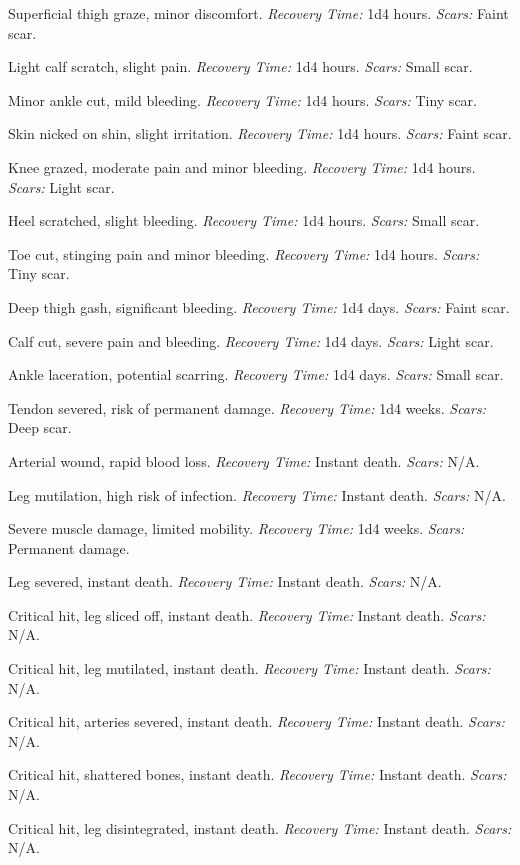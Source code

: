 \documentclass[12pt]{book}
\begin{document}
\begin{description}[labelwidth=1.5em, leftmargin=*, itemsep=0.4em]
    \item[1 -] Superficial thigh graze, minor discomfort. \textit{Recovery Time:} 1d4 hours. \textit{Scars:} Faint scar.
    \item[2 -] Light calf scratch, slight pain. \textit{Recovery Time:} 1d4 hours. \textit{Scars:} Small scar.
    \item[3 -] Minor ankle cut, mild bleeding. \textit{Recovery Time:} 1d4 hours. \textit{Scars:} Tiny scar.
    \item[4 -] Skin nicked on shin, slight irritation. \textit{Recovery Time:} 1d4 hours. \textit{Scars:} Faint scar.
    \item[5 -] Knee grazed, moderate pain and minor bleeding. \textit{Recovery Time:} 1d4 hours. \textit{Scars:} Light scar.
    \item[6 -] Heel scratched, slight bleeding. \textit{Recovery Time:} 1d4 hours. \textit{Scars:} Small scar.
    \item[7 -] Toe cut, stinging pain and minor bleeding. \textit{Recovery Time:} 1d4 hours. \textit{Scars:} Tiny scar.
    \item[8 -] Deep thigh gash, significant bleeding. \textit{Recovery Time:} 1d4 days. \textit{Scars:} Faint scar.
    \item[9 -] Calf cut, severe pain and bleeding. \textit{Recovery Time:} 1d4 days. \textit{Scars:} Light scar.
    \item[10 -] Ankle laceration, potential scarring. \textit{Recovery Time:} 1d4 days. \textit{Scars:} Small scar.
    \item[11 -] Tendon severed, risk of permanent damage. \textit{Recovery Time:} 1d4 weeks. \textit{Scars:} Deep scar.
    \item[12 -] Arterial wound, rapid blood loss. \textit{Recovery Time:} Instant death. \textit{Scars:} N/A.
    \item[13 -] Leg mutilation, high risk of infection. \textit{Recovery Time:} Instant death. \textit{Scars:} N/A.
    \item[14 -] Severe muscle damage, limited mobility. \textit{Recovery Time:} 1d4 weeks. \textit{Scars:} Permanent damage.
    \item[15 -] Leg severed, instant death. \textit{Recovery Time:} Instant death. \textit{Scars:} N/A.
    \item[16 -] Critical hit, leg sliced off, instant death. \textit{Recovery Time:} Instant death. \textit{Scars:} N/A.
    \item[17 -] Critical hit, leg mutilated, instant death. \textit{Recovery Time:} Instant death. \textit{Scars:} N/A.
    \item[18 -] Critical hit, arteries severed, instant death. \textit{Recovery Time:} Instant death. \textit{Scars:} N/A.
    \item[19 -] Critical hit, shattered bones, instant death. \textit{Recovery Time:} Instant death. \textit{Scars:} N/A.
    \item[20 -] Critical hit, leg disintegrated, instant death. \textit{Recovery Time:} Instant death. \textit{Scars:} N/A.
\end{description}
\end{document}
